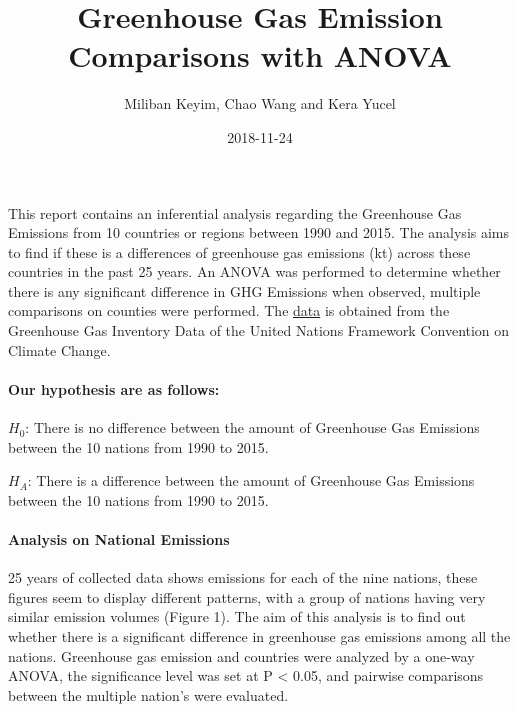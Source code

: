 \documentclass[]{article}
\title{Greenhouse Gas Emission Comparisons with ANOVA}
\author{Miliban Keyim, Chao Wang and Kera Yucel}
\date{2018-11-24}
\let\oldparagraph\paragraph
\renewcommand{\paragraph}[1]{\oldparagraph{#1}\mbox{}}
\begin{document}
\maketitle

This report contains an inferential analysis regarding the Greenhouse
Gas Emissions from 10 countries or regions between 1990 and 2015. The
analysis aims to find if these is a differences of greenhouse gas
emissions (kt) across these countries in the past 25 years. An ANOVA was
performed to determine whether there is any significant difference in
GHG Emissions when observed, multiple comparisons on counties were
performed. The
\href{\%22http://data.un.org/Data.aspx?d=GHG\&f=seriesID\%3aGH2\%22}{data}
is obtained from the Greenhouse Gas Inventory Data of the United Nations
Framework Convention on Climate Change.

\paragraph{Our hypothesis are as
follows:}\label{our-hypothesis-are-as-follows}

\(H_{0}\): There is no difference between the amount of Greenhouse Gas
Emissions between the 10 nations from 1990 to 2015.

\(H_{A}\): There is a difference between the amount of Greenhouse Gas
Emissions between the 10 nations from 1990 to 2015.

\paragraph{Analysis on National
Emissions}\label{analysis-on-national-emissions}

25 years of collected data shows emissions for each of the nine nations,
these figures seem to display different patterns, with a group of
nations having very similar emission volumes (Figure 1). The aim of this
analysis is to find out whether there is a significant difference in
greenhouse gas emissions among all the nations. Greenhouse gas emission
and countries were analyzed by a one-way ANOVA, the significance level
was set at P \textless{} 0.05, and pairwise comparisons between the
multiple nation's were evaluated.
\end{document}
